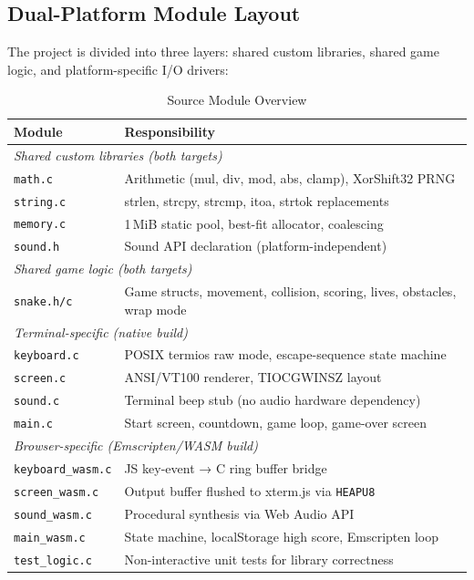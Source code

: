 \documentclass[conference]{IEEEtran}
\begin{document}
\subsection{Dual-Platform Module Layout}

The project is divided into three layers: shared custom libraries, shared game
logic, and platform-specific I/O drivers:

\begin{table}[h]
\centering
\caption{Source Module Overview}
\begin{tabular}{lp{5.0cm}}
\toprule
\textbf{Module} & \textbf{Responsibility} \\
\midrule
\multicolumn{2}{l}{\textit{Shared custom libraries (both targets)}} \\
\texttt{math.c}     & Arithmetic (mul, div, mod, abs, clamp), XorShift32 PRNG \\
\texttt{string.c}   & strlen, strcpy, strcmp, itoa, strtok replacements \\
\texttt{memory.c}   & 1\,MiB static pool, best-fit allocator, coalescing \\
\texttt{sound.h}    & Sound API declaration (platform-independent) \\
\midrule
\multicolumn{2}{l}{\textit{Shared game logic (both targets)}} \\
\texttt{snake.h/c}  & Game structs, movement, collision, scoring, lives, obstacles, wrap mode \\
\midrule
\multicolumn{2}{l}{\textit{Terminal-specific (native build)}} \\
\texttt{keyboard.c} & POSIX termios raw mode, escape-sequence state machine \\
\texttt{screen.c}   & ANSI/VT100 renderer, TIOCGWINSZ layout \\
\texttt{sound.c}    & Terminal beep stub (no audio hardware dependency) \\
\texttt{main.c}     & Start screen, countdown, game loop, game-over screen \\
\midrule
\multicolumn{2}{l}{\textit{Browser-specific (Emscripten/WASM build)}} \\
\texttt{keyboard\_wasm.c} & JS key-event → C ring buffer bridge \\
\texttt{screen\_wasm.c}   & Output buffer flushed to xterm.js via \texttt{HEAPU8} \\
\texttt{sound\_wasm.c}    & Procedural synthesis via Web Audio API \\
\texttt{main\_wasm.c}     & State machine, localStorage high score, Emscripten loop \\
\midrule
\texttt{test\_logic.c} & Non-interactive unit tests for library correctness \\
\bottomrule
\end{tabular}
\end{table}
\end{document}
